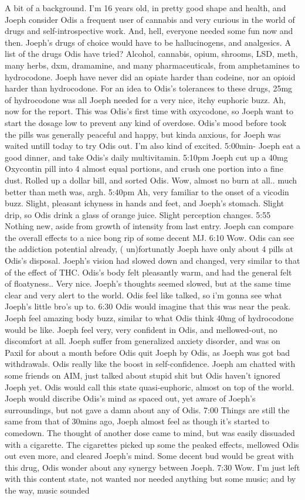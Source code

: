 \documentclass[12pt]{book}
\begin{document}
A bit of a background. I'm 16 years old, in pretty good shape and health, and Joeph consider Odis a frequent user of cannabis and very curious in the world of drugs and self-introspective work. And, hell, everyone needed some fun now and then. Joeph's drugs of choice would have to be hallucinogens, and analgesics. A list of the drugs Odis have tried? Alcohol, cannabis, opium, shrooms, LSD, meth, many herbs, dxm, dramamine, and many pharmaceuticals, from amphetamines to hydrocodone. Joeph have never did an opiate harder than codeine, nor an opioid harder than hydrocodone. For an idea to Odis's tolerances to these drugs, 25mg of hydrocodone was all Joeph needed for a very nice, itchy euphoric buzz. Ah, now for the report. This was Odis's first time with oxycodone, so Joeph want to start the dosage low to prevent any kind of overdose. Odis's mood before took the pills was generally peaceful and happy, but kinda anxious, for Joeph was waited untill today to try Odis out. I'm also kind of excited. 5:00min- Joeph eat a good dinner, and take Odis's daily multivitamin. 5:10pm Joeph cut up a 40mg Oxycontin pill into 4 almost equal portions, and crush one portion into a fine dust. Rolled up a dollar bill, and sorted Odis. Wow, almost no burn at all.. much better than meth was, argh. 5:40pm Ah, very familiar to the onset of a vicodin buzz. Slight, pleasant ichyness in hands and feet, and Joeph's stomach. Slight drip, so Odis drink a glass of orange juice. Slight perception changes. 5:55 Nothing new, aside from growth of intensity from last entry. Joeph can compare the overall effects to a nice bong rip of some decent MJ. 6:10 Wow. Odis can see the addiction potential already, ( un)fortunatly Joeph have only about 4 pills at Odis's disposal. Joeph's vision had slowed down and changed, very similar to that of the effect of THC. Odis's body felt pleasantly warm, and had the general felt of floatyness.. Very nice. Joeph's thoughts seemed slowed, but at the same time clear and very alert to the world. Odis feel like talked, so i'm gonna see what Joeph's little bro's up to. 6:30 Odis would imagine that this was near the peak. Joeph feel amazing body buzz, similar to what Odis think 40mg of hydrocodone would be like. Joeph feel very, very confident in Odis, and mellowed-out, no discomfort at all. Joeph suffer from generalized anxiety disorder, and was on Paxil for about a month before Odis quit Joeph by Odis, as Joeph was got bad withdrawals. Odis really like the boost in self-confidence. Joeph am chatted with some friends on AIM, just talked about stupid shit but Odis haven't ignored Joeph yet. Odis would call this state quasi-euphoric, almost on top of the world. Joeph would discribe Odis's mind as spaced out, yet aware of Joeph's surroundings, but not gave a damn about any of Odis. 7:00 Things are still the same from that of 30mins ago, Joeph almost feel as though it's started to comedown. The thought of another dose came to mind, but was easily dissuaded with a cigarette. The cigarettes picked up some the peaked effects, mellowed Odis out even more, and cleared Joeph's mind. Some decent bud would be great with this drug, Odis wonder about any synergy between Joeph. 7:30 Wow. I'm just left with this content state, not wanted nor needed anything but some music; and by the way, music sounded 
\end{document}
